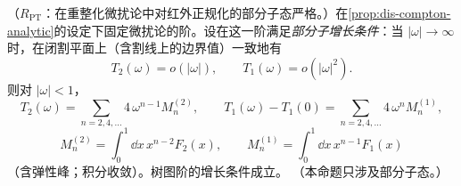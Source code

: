 \begin{proposition}[色散关系：Taylor 系数 = 矩（部分子靶） \tagR]\label{prop:dis-dispersion}
（$R_{\mathrm{PT}}$：在重整化微扰论中对红外正规化的部分子态严格。）在\cref{prop:dis-compton-analytic}的设定下固定微扰论的阶。设在这一阶满足\emph{部分子增长条件}：当 $|\omega|\to\infty$ 时，在闭割平面上（含割线上的边界值）一致地有
\begin{equation}\label{eq:dis-pt-growth}
T_2(\omega)=o(|\omega|),\qquad T_1(\omega)=o(|\omega|^2).
\end{equation}
则对 $|\omega|<1$，
\begin{equation}\label{eq:dis-dispersion}
T_2(\omega)=\sum_{n=2,4,\dots}4\,\omega^{n-1}M^{(2)}_n,\qquad T_1(\omega)-T_1(0)=\sum_{n=2,4,\dots}4\,\omega^nM^{(1)}_n,
\end{equation}
\begin{equation}\label{eq:dis-moments-def}
M^{(2)}_n=\int_0^1\dd x\,x^{n-2}F_2(x),\qquad M^{(1)}_n=\int_0^1\dd x\,x^{n-1}F_1(x)
\end{equation}
（含弹性峰；积分收敛）。树图阶的增长条件成立。%
（本命题只涉及部分子态。）
\end{proposition}

